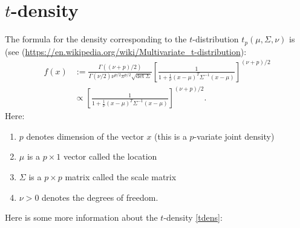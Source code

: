 \documentclass{scrartcl}
\begin{document}
\section{$t$-density}
The formula for the density corresponding to the $t$-distribution
$t_{p}(\mu, \Sigma, \nu)$ is (see
(\url{https://en.wikipedia.org/wiki/Multivariate_t-distribution}): 
\begin{align}
 f(x) &:= \frac{\Gamma((\nu + p)/2)}{\Gamma(\nu/2) \nu^{p/2} \pi^{p/2}
   \sqrt{\text{det}~\Sigma}} \left[\frac{1}{1 + \frac{1}{\nu} (x - \mu)^T
      \Sigma^{-1} (x - \mu)} \right]^{(\nu + p)/2} \nonumber \\
      &\propto  \left[\frac{1}{1 + \frac{1}{\nu} (x - \mu)^T 
      \Sigma^{-1} (x - \mu)} \right]^{(\nu + p)/2}. \label{tdens}
\end{align}
Here:
\begin{enumerate}
\item $p$ denotes dimension of the vector $x$ (this is a $p$-variate
  joint density)
\item $\mu$ is a $p \times 1$ vector called the location
\item $\Sigma$ is a $p \times p$ matrix called the scale matrix
\item $\nu > 0$   denotes the degrees of freedom. 
\end{enumerate}
Here is some more information about the $t$-density \eqref{tdens}:
\end{document}
